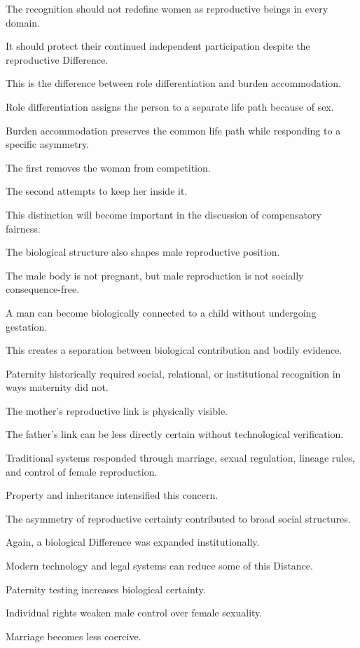 The recognition should not redefine women as reproductive beings in every domain.

It should protect their continued independent participation despite the reproductive Difference.

This is the difference between role differentiation and burden accommodation.

Role differentiation assigns the person to a separate life path because of sex.

Burden accommodation preserves the common life path while responding to a specific asymmetry.

The first removes the woman from competition.

The second attempts to keep her inside it.

This distinction will become important in the discussion of compensatory fairness.

The biological structure also shapes male reproductive position.

The male body is not pregnant, but male reproduction is not socially consequence-free.

A man can become biologically connected to a child without undergoing gestation.

This creates a separation between biological contribution and bodily evidence.

Paternity historically required social, relational, or institutional recognition in ways maternity did not.

The mother’s reproductive link is physically visible.

The father’s link can be less directly certain without technological verification.

Traditional systems responded through marriage, sexual regulation, lineage rules, and control of female reproduction.

Property and inheritance intensified this concern.

The asymmetry of reproductive certainty contributed to broad social structures.

Again, a biological Difference was expanded institutionally.

Modern technology and legal systems can reduce some of this Distance.

Paternity testing increases biological certainty.

Individual rights weaken male control over female sexuality.

Marriage becomes less coercive.

